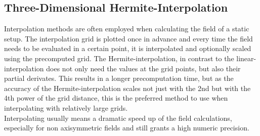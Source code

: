   \subsection{Three-Dimensional Hermite-Interpolation} %
    Interpolation methods are often employed when calculating the field of a static setup. The interpolation grid is plotted once in advance and every time the field needs to be evaluated in a certain point, it is interpolated and optionally scaled using the precomputed grid. The Hermite-interpolation, in contrast to the linear-interpolation does not only need the values at the grid points, but also their partial derivates. This results in a longer precomputation time, but as the accuracy of the Hermite-interpolation scales not just with the 2nd but with the 4th power of the grid distance, this is the preferred method to use when interpolating with relatively large grids. \\  
    Interpolating usually means a dramatic speed up of the field calculations, especially for non axisymmetric fields and still grants a high numeric precision.
